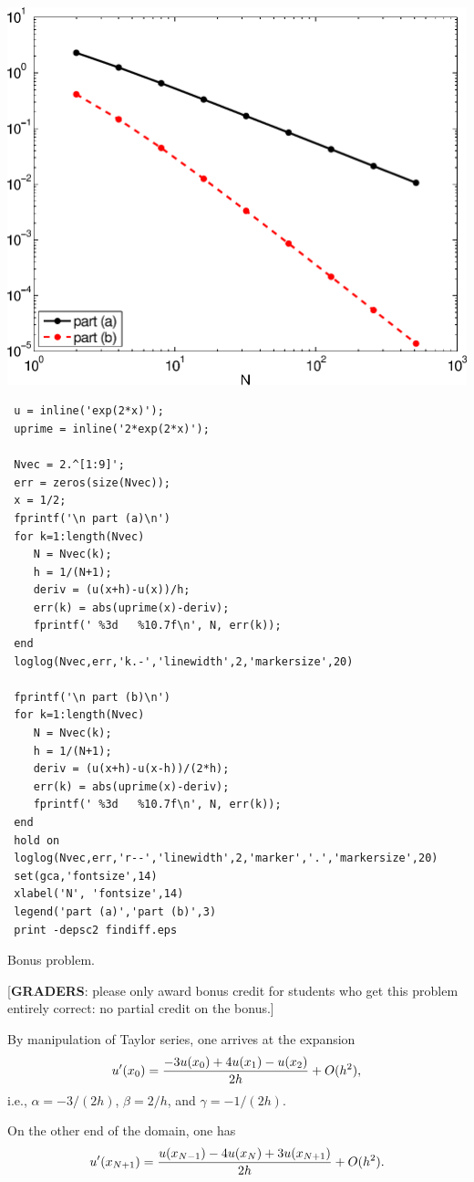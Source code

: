 \begin{solution}
\begin{enumerate}
\begin{center}
\includegraphics[scale=0.7]{findiff}
\end{center}

{\small \begin{verbatim}
 u = inline('exp(2*x)');
 uprime = inline('2*exp(2*x)');

 Nvec = 2.^[1:9]';
 err = zeros(size(Nvec));
 x = 1/2;
 fprintf('\n part (a)\n')
 for k=1:length(Nvec)
    N = Nvec(k);
    h = 1/(N+1);
    deriv = (u(x+h)-u(x))/h;
    err(k) = abs(uprime(x)-deriv);
    fprintf(' %3d   %10.7f\n', N, err(k));
 end
 loglog(Nvec,err,'k.-','linewidth',2,'markersize',20)

 fprintf('\n part (b)\n')
 for k=1:length(Nvec)
    N = Nvec(k);
    h = 1/(N+1);
    deriv = (u(x+h)-u(x-h))/(2*h);
    err(k) = abs(uprime(x)-deriv);
    fprintf(' %3d   %10.7f\n', N, err(k));
 end
 hold on
 loglog(Nvec,err,'r--','linewidth',2,'marker','.','markersize',20)
 set(gca,'fontsize',14)
 xlabel('N', 'fontsize',14)
 legend('part (a)','part (b)',3)
 print -depsc2 findiff.eps
\end{verbatim}}
\end{enumerate}

Bonus problem.  

[\textbf{GRADERS}: please only award bonus credit for students
who get this problem entirely correct: no partial credit on the bonus.]

By manipulation of Taylor series, one arrives at the expansion
\[ u'(x_0) = {-3 u(x_0) + 4 u(x_1) - u(x_2) \over 2 h} + O(h^2),\]
i.e., $\alpha = -3/(2h)$, $\beta = 2/h$, and $\gamma = -1/(2h)$.

On the other end of the domain, one has
\[ u'(x_{N+1}) = {u(x_{N-1}) - 4 u(x_N) + 3 u(x_{N+1}) \over 2 h} + O(h^2).\]

\end{solution}
